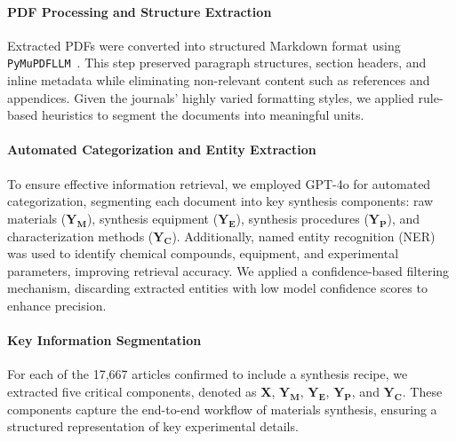\paragraph{PDF Processing and Structure Extraction}
Extracted PDFs were converted into structured Markdown format using \texttt{PyMuPDFLLM}~\cite{pymupdf4llm2024}. This step preserved paragraph structures, section headers, and inline metadata while eliminating non-relevant content such as references and appendices. Given the journals' highly varied formatting styles, we applied rule-based heuristics to segment the documents into meaningful units.

\paragraph{Automated Categorization and Entity Extraction}  
To ensure effective information retrieval, we employed GPT-4o for automated categorization, segmenting each document into key synthesis components: raw materials (\(\mathbf{Y_M}\)), synthesis equipment (\(\mathbf{Y_E}\)), synthesis procedures (\(\mathbf{Y_P}\)), and characterization methods (\(\mathbf{Y_C}\)). Additionally, named entity recognition (NER) was used to identify chemical compounds, equipment, and experimental parameters, improving retrieval accuracy. We applied a confidence-based filtering mechanism, discarding extracted entities with low model confidence scores to enhance precision.

\paragraph{Key Information Segmentation}  
For each of the 17,667 articles confirmed to include a synthesis recipe, we extracted five critical components, denoted as \textbf{X}, \(\mathbf{Y_M}\), \(\mathbf{Y_E}\), \(\mathbf{Y_P}\), and \(\mathbf{Y_C}\). These components capture the end-to-end workflow of materials synthesis, ensuring a structured representation of key experimental details.

